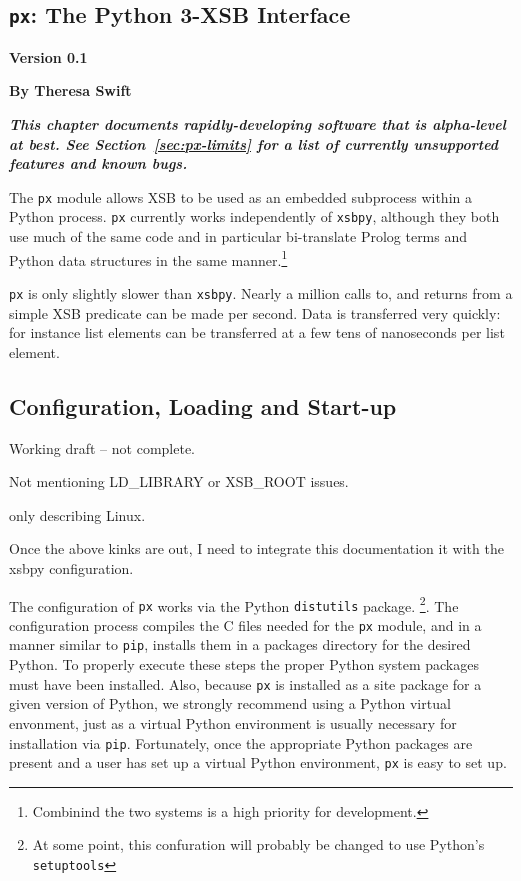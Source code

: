 
\newcommand{\pxversion}{Version 0.1}

\begin{center}
\chapter[Python and XSB]{{\tt px}: The Python 3-XSB Interface} \label{chap:px}
\end{center}

\vspace*{-.30in} 
\begin{center}
{\Large {\bf  \pxversion}}
\end{center}

\begin{center}
  {\Large {\bf By Theresa Swift}}
\end{center}

\noindent
{\large {\bf {\em This chapter documents rapidly-developing software
      that is alpha-level at best.  See Section~\ref{sec:px-limits}
      for a list of currently unsupported features and known bugs.}}}

The {\tt px} module allows XSB to be used as an embedded subprocess
within a Python process.  {\tt px} currently works independently of
{\tt xsbpy}, although they both use much of the same code and in
particular bi-translate Prolog terms and Python data structures in the
same manner.\footnote{Combinind the two systems is a high priority
  for development.}

{\tt px} is only slightly slower than {\tt xsbpy}.  Nearly a million
calls to, and returns from a simple XSB predicate can be made per
second.  Data is transferred very quickly: for instance list elements
can be transferred at a few tens of nanoseconds per list element.

\section{Configuration, Loading and Start-up}

{\sc Working draft -- not complete.
  \bi
  \item Not mentioning LD\_LIBRARY or XSB\_ROOT issues.
  \item  only describing Linux.
  \item Once the above kinks are out, I need to integrate this
    documentation it with the xsbpy configuration.
    \ei
    }

The configuration of {\tt px} works via the Python {\tt distutils}
package. \footnote{At some point, this confuration will probably be
  changed to use Python's {\tt setuptools}}.  The configuration
process compiles the C files needed for the {\tt px} module, and in a
manner similar to {\tt pip}, installs them in a packages directory for
the desired Python.  To properly execute these steps the proper Python
system packages must have been installed.  Also, because {\tt px} is
installed as a site package for a given version of Python, we strongly
recommend using a Python virtual envonment, just as a virtual Python
environment is usually necessary for installation via {\tt pip}.
Fortunately, once the appropriate Python packages are present and a
user has set up a virtual Python environment, {\tt px} is easy to set
up.

